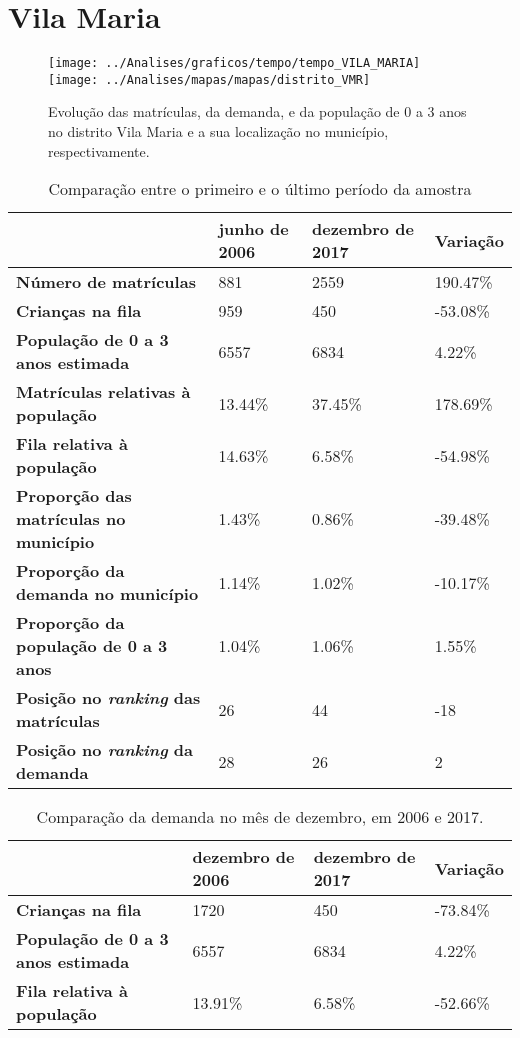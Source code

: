 \section{Vila Maria}
\begin{figure}[H]
\centering
\texttt{[image: ../Analises/graficos/tempo/tempo\_VILA\_MARIA]}
\texttt{[image: ../Analises/mapas/mapas/distrito\_VMR]}
\caption{Evolução das matrículas, da demanda, e da população de 0 a 3 anos no distrito Vila Maria e a sua localização no município, respectivamente.}
\end{figure}
\begin{table}[H]
\begin{tabular}{l|l|l|l}
\textbf{}                                      & \textbf{junho de 2006}       & \textbf{dezembro de 2017}    & \textbf{Variação} \\ \hline
\textbf{Número de matrículas}                  & 881 & 2559 & 190.47\% \\ \hline
\textbf{Crianças na fila}                      & 959 & 450 & -53.08\% \\ \hline
\textbf{População de 0 a 3 anos estimada}      & 6557 & 6834 & 4.22\% \\ \hline
\textbf{Matrículas relativas à população}      & 13.44\% & 37.45\% & 178.69\% \\ \hline
\textbf{Fila relativa à população}             & 14.63\% & 6.58\% & -54.98\% \\ \hline
\textbf{Proporção das matrículas no município} & 1.43\% & 0.86\% & -39.48\% \\ \hline
\textbf{Proporção da demanda no município}     & 1.14\% & 1.02\% & -10.17\% \\ \hline
\textbf{Proporção da população de 0 a 3 anos}  & 1.04\% & 1.06\% & 1.55\% \\ \hline
\textbf{Posição no \textit{ranking} das matrículas}     & 26 & 44 & -18 \\ \hline
\textbf{Posição no \textit{ranking} da demanda}         & 28 & 26 & 2 \\ 
\end{tabular}
\caption{Comparação entre o primeiro e o último período da amostra}
\end{table}
\begin{table}[H]
\begin{tabular}{l|l|l|l}
\textbf{}                                 & \textbf{dezembro de 2006} & \textbf{dezembro de 2017} & \textbf{Variação} \\ \hline
\textbf{Crianças na fila}                      & 1720 & 450 & -73.84\% \\ \hline
\textbf{População de 0 a 3 anos estimada}      & 6557 & 6834 & 4.22\% \\ \hline
\textbf{Fila relativa à população}             & 13.91\% & 6.58\% & -52.66\% \\
\end{tabular}
\caption{Comparação da demanda no mês de dezembro, em 2006 e 2017.}
\end{table}
